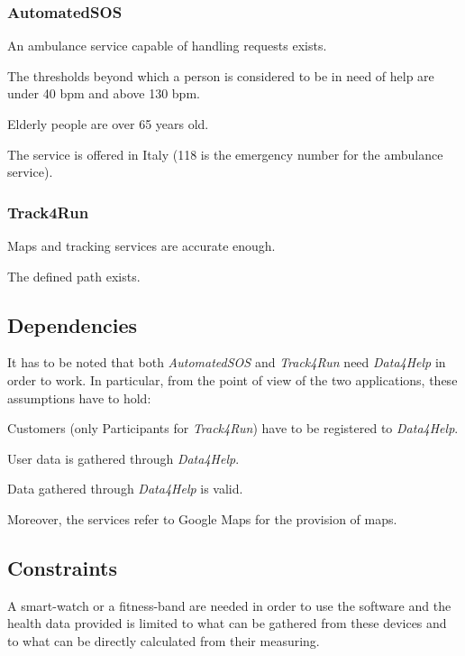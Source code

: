         \subsubsection{AutomatedSOS}
            \begin{enumerate}[label={[}D2.\arabic*{]}]
                \item An ambulance service capable of handling requests exists.
                
                \item The thresholds beyond which a person is considered to be in need of help are under 40 bpm and above 130 bpm.
                \item Elderly people are over 65 years old.
                
                \item The service is offered in Italy (118 is the emergency number for the ambulance service).
            \end{enumerate}
            
            \subsubsection{Track4Run}
                \begin{enumerate}[label={[}D3.\arabic*{]}]
                    \item Maps and tracking services are accurate enough.
                    
                    \item The defined path exists.
                \end{enumerate}
                
    \subsection{Dependencies}
        It has to be noted that both \emph{AutomatedSOS} and \emph{Track4Run} need \emph{Data4Help} in order to work. In particular, from the point of view of the two applications, these assumptions have to hold:
        \begin{enumerate}[label={[}D2-3.\arabic*{]}, leftmargin=*]
            \item Customers (only Participants for \emph{Track4Run}) have to be registered to \emph{Data4Help}.
            
            \item User data is gathered through \emph{Data4Help}.
            
            \item Data gathered through \emph{Data4Help} is valid. \\
        \end{enumerate}
        Moreover, the services refer to Google Maps for the provision of maps.
        
    \subsection{Constraints}
        A smart-watch or a fitness-band are needed in order to use the software and the health data provided is limited to what can be gathered from these devices and to what can be directly calculated from their measuring.
